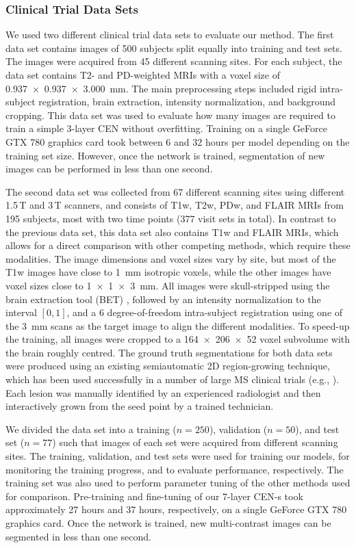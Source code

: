\subsubsection{Clinical Trial Data Sets}

We used two different clinical trial data sets to evaluate our method. The first
data set contains images of 500 subjects split equally into training and test
sets. The images were acquired from 45 different scanning sites. For each
subject, the data set contains T2- and PD-weighted MRIs with a voxel size of
\SI{0.937x0.937x3.000}{\milli\metre}. The main preprocessing steps included
rigid intra-subject registration, brain extraction, intensity normalization, and
background cropping. This data set was used to evaluate how many images are
required to train a simple 3-layer CEN without overfitting. Training on a
single GeForce GTX 780 graphics card took between 6 and 32 hours per model
depending on the training set size. However, once the network is trained,
segmentation of new images can be performed in less than one second.

The second data set was collected from 67 different scanning sites using
different 1.5\,T and 3\,T scanners, and consists of T1w, T2w, PDw, and FLAIR
MRIs from 195 subjects, most with two time points (377 visit sets in total). In
contrast to the previous data set, this data set also contains T1w and FLAIR
MRIs, which allows for a direct comparison with other competing methods, which
require these modalities. The image dimensions and voxel sizes vary by site, but
most of the T1w images have close to \SI{1}{\milli\meter} isotropic voxels,
while the other images have voxel sizes close to \SI{1x1x3}{\milli\meter}. All
images were skull-stripped using the brain extraction tool (BET)
\citep{jenkinson2005}, followed by an intensity normalization to the
interval $[0,1]$, and a 6 degree-of-freedom intra-subject registration using one
of the \SI{3}{\milli\meter} scans as the target image to align the different
modalities. To speed-up the training, all images were cropped to a
\num{164x206x52} voxel subvolume with the brain roughly centred. The ground
truth segmentations for both data sets were produced using an existing
semiautomatic 2D region-growing technique, which has been used successfully in a
number of large MS clinical trials (e.g.,
\citealp{kappos2006,traboulsee2008}).
Each lesion was manually identified by an experienced radiologist and then
interactively grown from the seed point by a trained technician.

We divided the data set into a training ($n=250$), validation ($n=50$), and test
set ($n=77$) such that images of each set were acquired from different scanning
sites. The training, validation, and test sets were used for training our
models, for monitoring the training progress, and to evaluate performance,
respectively. The training set was also used to perform parameter tuning of the
other methods used for comparison. Pre-training and fine-tuning of our 7-layer
CEN-s took approximately 27 hours and 37 hours, respectively, on a single
GeForce GTX 780 graphics card. Once the network is trained, new multi-contrast
images can be segmented in less than one second.


